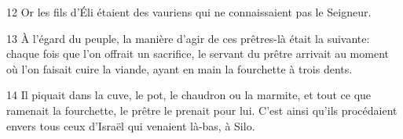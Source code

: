 12 Or les fils d’Éli étaient des vauriens qui ne connaissaient pas le Seigneur.

13 À l’égard du peuple, la manière d’agir de ces prêtres-là était la suivante: chaque fois que l’on offrait un sacrifice, le servant du prêtre arrivait au moment où l’on faisait cuire la viande, ayant en main la fourchette à trois dents.

14 Il piquait dans la cuve, le pot, le chaudron ou la marmite, et tout ce que ramenait la fourchette, le prêtre le prenait pour lui. C’est ainsi qu’ils procédaient envers tous ceux d’Israël qui venaient là-bas, à Silo.

